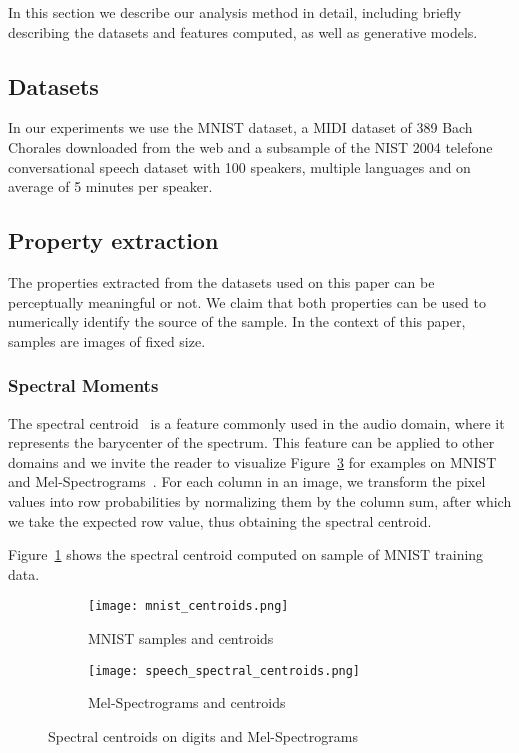 In this section we describe our analysis method in detail, including
briefly describing the datasets and features computed, as well as generative
models.
\subsection{Datasets}
In our experiments we use the MNIST dataset, a MIDI dataset of 389 Bach Chorales downloaded from the web and a subsample of the NIST 2004 telefone
conversational speech dataset with 100 speakers, multiple languages and
on average of 5 minutes per speaker.

\subsection{Property extraction}
The properties extracted from the datasets used on this paper can be
perceptually meaningful or not. We claim that both properties can be used to numerically identify the source of the sample. In the context of this
paper, samples are images of fixed size. 

\subsubsection{Spectral Moments}
The spectral centroid~\cite{peeters2004large} is a feature commonly used in the
audio domain, where it represents the barycenter of the spectrum. This feature
can be applied to other domains and we invite the reader to visualize 
Figure~\ref{fig:centroids} for examples on MNIST and
Mel-Spectrograms~\cite{peeters2004large}. For each column in an image, we 
transform the pixel values into row probabilities by normalizing them by the
column sum, after which we take the expected row value, thus obtaining the
spectral centroid.

Figure~\ref{fig:mnist_centroids} shows the spectral centroid computed
on sample of MNIST training data.

\begin{figure}[!h]
    \centering
    \begin{subfigure}[b]{0.4\textwidth}
        \texttt{[image: mnist\_centroids.png]}
        \caption{MNIST samples and centroids}
        \label{fig:mnist_centroids}
    \end{subfigure}
    \quad
    \begin{subfigure}[b]{0.4\textwidth}
        \texttt{[image: speech\_spectral\_centroids.png]}
        \caption{Mel-Spectrograms and centroids}
        \label{fig:spectrogram_centroids}
    \end{subfigure}
    \caption{Spectral centroids on digits and Mel-Spectrograms}
    \label{fig:centroids}
\end{figure}

